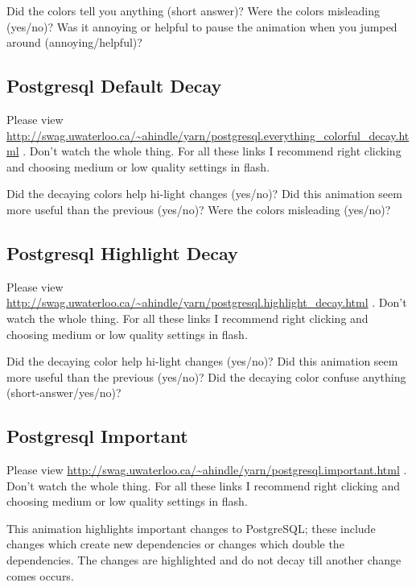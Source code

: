 \documentclass{article}
\begin{document}
\begin{itemize}
\qitem Did the colors tell you anything (short answer)?
\qitem Were the colors misleading (yes/no)?
\qitem Was it annoying or helpful to pause the animation when you jumped around (annoying/helpful)?
\end{itemize}

\subsection{Postgresql Default Decay}

Please view
\url{http://swag.uwaterloo.ca/~ahindle/yarn/postgresql.everything_colorful_decay.html} .  Don't
watch the whole thing. For all these links I recommend right clicking
and choosing medium or low quality settings in flash.

\begin{itemize}
\qitem Did the decaying colors help hi-light changes (yes/no)?
\qitem Did this animation seem more useful than the previous (yes/no)?
\qitem Were the colors misleading (yes/no)?
\end{itemize}

\subsection{Postgresql Highlight Decay}

Please view
\url{http://swag.uwaterloo.ca/~ahindle/yarn/postgresql.highlight_decay.html} .  Don't
watch the whole thing. For all these links I recommend right clicking
and choosing medium or low quality settings in flash.

\begin{itemize}
\qitem Did the decaying color help hi-light changes (yes/no)?
\qitem Did this animation seem more useful than the previous (yes/no)?
\qitem Did the decaying color confuse anything (short-answer/yes/no)?
\end{itemize}

\subsection{Postgresql Important}
Please view
\url{http://swag.uwaterloo.ca/~ahindle/yarn/postgresql.important.html}
.  Don't watch the whole thing. For all these links I recommend right
clicking and choosing medium or low quality settings in flash.

This animation highlights important changes to PostgreSQL; these
include changes which create new dependencies or changes which double
the dependencies. The changes are highlighted and do not decay till
another change comes occurs.
\end{document}

